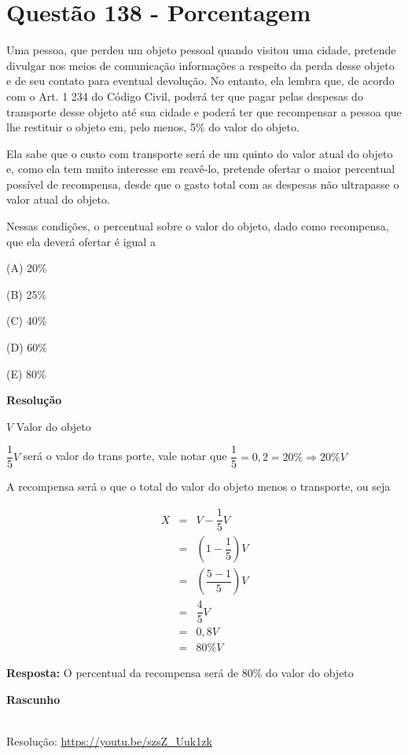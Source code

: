 \section{Questão 138 - Porcentagem}

Uma pessoa, que perdeu um objeto pessoal quando visitou uma cidade, pretende divulgar nos meios de comunicação informações a respeito da perda desse objeto e de seu contato para eventual devolução. 
No entanto, ela lembra que, de acordo com o Art. 1 234 do Código Civil, poderá ter que pagar pelas despesas do transporte desse objeto até sua cidade e poderá ter que recompensar a pessoa que lhe restituir o objeto em, pelo menos, 5\% do valor do objeto. 

Ela sabe que o custo com transporte será de um quinto do valor atual do objeto e, como ela tem muito interesse em reavê-lo, pretende ofertar o maior percentual possível de recompensa, desde que o gasto total com as despesas não ultrapasse o valor atual do objeto.

Nessas condições, o percentual sobre o valor do objeto, dado como recompensa, que ela deverá ofertar é igual a

(A) 20\%

(B) 25\%

(C) 40\%

(D) 60\%

(E) 80\%

\textbf{Resolução}

$ V $ Valor do objeto

$ \dfrac{1}{5}V $ será o valor do trans porte, vale notar que $ \dfrac{1}{5} = 0,2 = 20\% \Rightarrow 20\%V $

A recompensa será o que o total do valor do objeto menos o transporte, ou seja


\begin{eqnarray*}
    X &=& V - \dfrac{1}{5}V \\
      &=& \left(1 - \dfrac{1}{5}\right)V \\
      &=& \left(\dfrac{5 - 1}{5}\right)V \\
      &=& \dfrac{4}{5}V \\
      &=& 0,8V \\
      &=& 80\%V 
\end{eqnarray*}

\textbf{Resposta:} O percentual da recompensa será de 80\% do valor do objeto

\textbf{Rascunho}



\begin{center}
    \href{https://youtu.be/S22SHYt4n-o}{
    }\\
    Resolução: \url{https://youtu.be/szsZ_Uuk1zk}
\end{center}
